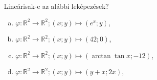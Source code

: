\begin{exercise}{Lineárisak-e az alábbi leképezések?}
  \begin{enumerate}[a)]
    \item \(
          \varphi: \mathbb R^2 \rightarrow \mathbb R^2;
          (x; y) \mapsto (e^x; y)
          \),
    \item \(
          \varphi: \mathbb R^2 \rightarrow \mathbb R^2;
          (x; y) \mapsto (42; 0)
          \),
    \item \(
          \varphi: \mathbb R^2 \rightarrow \mathbb R^2;
          (x; y) \mapsto (\arctan \tan x; -12)
          \),
    \item \(
          \varphi: \mathbb R^2 \rightarrow \mathbb R^2;
          (x; y) \mapsto (y + x; 2x)
          \),
  \end{enumerate}


\end{exercise}
